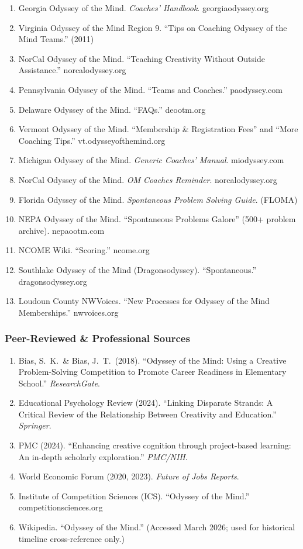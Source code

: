 \documentclass[11pt,letterpaper]{article}
\begin{document}
\begin{enumerate}[leftmargin=2em, start=5]
\item Georgia Odyssey of the Mind. \emph{Coaches' Handbook}. georgiaodyssey.org
\item Virginia Odyssey of the Mind Region 9. ``Tips on Coaching Odyssey of the Mind Teams.'' (2011)
\item NorCal Odyssey of the Mind. ``Teaching Creativity Without Outside Assistance.'' norcalodyssey.org
\item Pennsylvania Odyssey of the Mind. ``Teams and Coaches.'' paodyssey.com
\item Delaware Odyssey of the Mind. ``FAQs.'' deootm.org
\item Vermont Odyssey of the Mind. ``Membership \& Registration Fees'' and ``More Coaching Tips.'' vt.odysseyofthemind.org
\item Michigan Odyssey of the Mind. \emph{Generic Coaches' Manual}. miodyssey.com
\item NorCal Odyssey of the Mind. \emph{OM Coaches Reminder}. norcalodyssey.org
\item Florida Odyssey of the Mind. \emph{Spontaneous Problem Solving Guide}. (FLOMA)
\item NEPA Odyssey of the Mind. ``Spontaneous Problems Galore'' (500+ problem archive). nepaootm.com
\item NCOME Wiki. ``Scoring.'' ncome.org
\item Southlake Odyssey of the Mind (Dragonsodyssey). ``Spontaneous.'' dragonsodyssey.org
\item Loudoun County NWVoices. ``New Processes for Odyssey of the Mind Memberships.'' nwvoices.org
\end{enumerate}

\subsubsection{Peer-Reviewed \& Professional Sources}

\begin{enumerate}[leftmargin=2em, start=18]
\item Bias, S.\ K.\ \& Bias, J.\ T.\ (2018). ``Odyssey of the Mind: Using a Creative Problem-Solving Competition to Promote Career Readiness in Elementary School.'' \emph{ResearchGate}.
\item Educational Psychology Review (2024). ``Linking Disparate Strands: A Critical Review of the Relationship Between Creativity and Education.'' \emph{Springer}.
\item PMC (2024). ``Enhancing creative cognition through project-based learning: An in-depth scholarly exploration.'' \emph{PMC/NIH}.
\item World Economic Forum (2020, 2023). \emph{Future of Jobs Reports}.
\item Institute of Competition Sciences (ICS). ``Odyssey of the Mind.'' competitionsciences.org
\item Wikipedia. ``Odyssey of the Mind.'' (Accessed March 2026; used for historical timeline cross-reference only.)
\end{enumerate}
\end{document}
